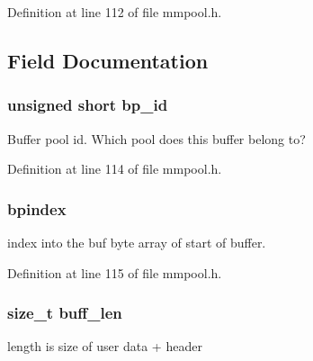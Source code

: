 Definition at line 112 of file mmpool.\-h.



\subsection{Field Documentation}
\hypertarget{struct__bpcf__buffer_ae67b46be019334905e0dccdf8415174d}{
\subsubsection[{bp\-\_\-id}]{\setlength{\rightskip}{0pt plus 5cm}unsigned short bp\-\_\-id}}\label{struct__bpcf__buffer_ae67b46be019334905e0dccdf8415174d}


Buffer pool id. Which pool does this buffer belong to? 



Definition at line 114 of file mmpool.\-h.

\hypertarget{struct__bpcf__buffer_a91e58d5ff6c3d739d694d1516619f9cc}{
\subsubsection[{bpindex}]{ bpindex}}\label{struct__bpcf__buffer_a91e58d5ff6c3d739d694d1516619f9cc}


index into the buf byte array of start of buffer. 



Definition at line 115 of file mmpool.\-h.

\hypertarget{struct__bpcf__buffer_a0a22f05ad0836231e9b3b8db6da29d0f}{
\subsubsection[{buff\-\_\-len}]{\setlength{\rightskip}{0pt plus 5cm}size\-\_\-t buff\-\_\-len}}\label{struct__bpcf__buffer_a0a22f05ad0836231e9b3b8db6da29d0f}


length is size of user data + header 



